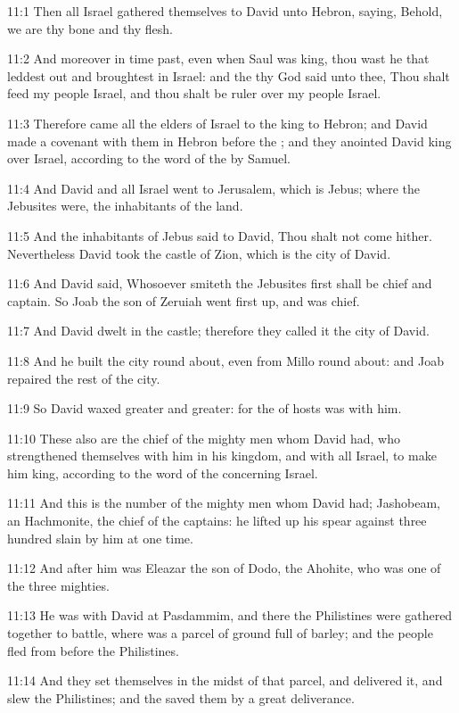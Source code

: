 11:1 Then all Israel gathered themselves to David unto Hebron, saying, Behold, we are thy bone and thy flesh.

11:2 And moreover in time past, even when Saul was king, thou wast he that leddest out and broughtest in Israel: and the \LORD thy God said unto thee, Thou shalt feed my people Israel, and thou shalt be ruler over my people Israel.

11:3 Therefore came all the elders of Israel to the king to Hebron; and David made a covenant with them in Hebron before the \LORD; and they anointed David king over Israel, according to the word of the \LORD by Samuel.

11:4 And David and all Israel went to Jerusalem, which is Jebus; where the Jebusites were, the inhabitants of the land.

11:5 And the inhabitants of Jebus said to David, Thou shalt not come hither. Nevertheless David took the castle of Zion, which is the city of David.

11:6 And David said, Whosoever smiteth the Jebusites first shall be chief and captain. So Joab the son of Zeruiah went first up, and was chief.

11:7 And David dwelt in the castle; therefore they called it the city of David.

11:8 And he built the city round about, even from Millo round about: and Joab repaired the rest of the city.

11:9 So David waxed greater and greater: for the \LORD of hosts was with him.

11:10 These also are the chief of the mighty men whom David had, who strengthened themselves with him in his kingdom, and with all Israel, to make him king, according to the word of the \LORD concerning Israel.

11:11 And this is the number of the mighty men whom David had; Jashobeam, an Hachmonite, the chief of the captains: he lifted up his spear against three hundred slain by him at one time.

11:12 And after him was Eleazar the son of Dodo, the Ahohite, who was one of the three mighties.

11:13 He was with David at Pasdammim, and there the Philistines were gathered together to battle, where was a parcel of ground full of barley; and the people fled from before the Philistines.

11:14 And they set themselves in the midst of that parcel, and delivered it, and slew the Philistines; and the \LORD saved them by a great deliverance.

